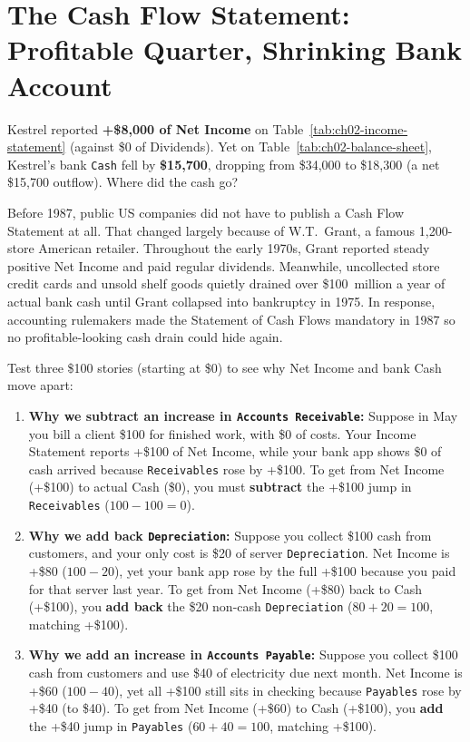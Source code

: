 \section{The Cash Flow Statement: Profitable Quarter, Shrinking Bank Account}

Kestrel reported \textbf{+\$8,000 of Net Income} on Table~\ref{tab:ch02-income-statement} (against \$0 of Dividends). Yet on Table~\ref{tab:ch02-balance-sheet}, Kestrel's bank \texttt{Cash} fell by \textbf{\$15,700}, dropping from \$34,000 to \$18,300 (a net \$15,700 outflow). Where did the cash go?

\begin{historybox}
Before 1987, public US companies did not have to publish a Cash Flow Statement at all. That changed largely because of W.T.\ Grant, a famous 1,200-store American retailer. Throughout the early 1970s, Grant reported steady positive Net Income and paid regular dividends. Meanwhile, uncollected store credit cards and unsold shelf goods quietly drained over \$100~million a year of actual bank cash until Grant collapsed into bankruptcy in 1975. In response, accounting rulemakers made the Statement of Cash Flows mandatory in 1987 so no profitable-looking cash drain could hide again.
\end{historybox}

Test three \$100 stories (starting at \$0) to see why Net Income and bank Cash move apart:
\begin{enumerate}
  \item \textbf{Why we subtract an increase in \texttt{Accounts Receivable}:} Suppose in May you bill a client \$100 for finished work, with \$0 of costs. Your Income Statement reports +\$100 of Net Income, while your bank app shows \$0 of cash arrived because \texttt{Receivables} rose by +\$100. To get from Net Income (+\$100) to actual Cash (\$0), you must \textbf{subtract} the +\$100 jump in \texttt{Receivables} ($100 - 100 = 0$).
  \item \textbf{Why we add back \texttt{Depreciation}:} Suppose you collect \$100 cash from customers, and your only cost is \$20 of server \texttt{Depreciation}. Net Income is +\$80 ($100 - 20$), yet your bank app rose by the full +\$100 because you paid for that server last year. To get from Net Income (+\$80) back to Cash (+\$100), you \textbf{add back} the \$20 non-cash \texttt{Depreciation} ($80 + 20 = 100$, matching +\$100).
  \item \textbf{Why we add an increase in \texttt{Accounts Payable}:} Suppose you collect \$100 cash from customers and use \$40 of electricity due next month. Net Income is +\$60 ($100 - 40$), yet all +\$100 still sits in checking because \texttt{Payables} rose by +\$40 (to \$40). To get from Net Income (+\$60) to Cash (+\$100), you \textbf{add} the +\$40 jump in \texttt{Payables} ($60 + 40 = 100$, matching +\$100).
\end{enumerate}

